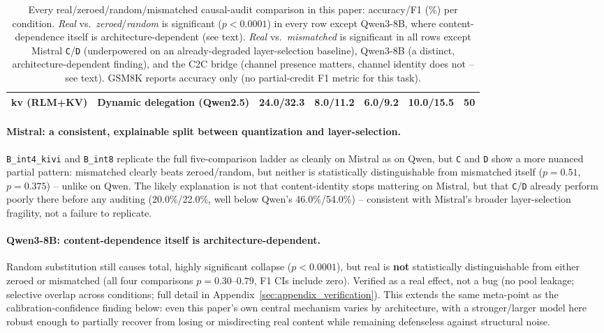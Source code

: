 \documentclass[11pt]{article}
\begin{document}
\begin{table}[t]
\begin{tabular}{llccccc}
kv (RLM+KV)   & Dynamic delegation (Qwen2.5) & 24.0/32.3 & 8.0/11.2 & 6.0/9.2  & 10.0/15.5 & 50 \\
\bottomrule
\end{tabular}
\caption{Every real/zeroed/random/mismatched causal-audit comparison in
this paper: accuracy/F1 (\%) per condition. \emph{Real} vs.\
\emph{zeroed}/\emph{random} is significant ($p<0.0001$) in every row
except Qwen3-8B, where content-dependence itself is architecture-dependent
(see text). \emph{Real} vs.\ \emph{mismatched} is significant in all rows
except Mistral \texttt{C}/\texttt{D} (underpowered on an already-degraded
layer-selection baseline), Qwen3-8B (a distinct, architecture-dependent
finding), and the C2C bridge (channel presence matters, channel identity
does not -- see text). GSM8K reports accuracy only (no partial-credit F1
metric for this task).}
\label{tab:causal_audit_full}
\end{table}

\paragraph{Mistral: a consistent, explainable split between quantization
and layer-selection.} \texttt{B\_int4\_kivi} and \texttt{B\_int8}
replicate the full five-comparison ladder as cleanly on Mistral as on
Qwen, but \texttt{C} and \texttt{D} show a more nuanced partial pattern:
mismatched clearly beats zeroed/random, but neither is statistically
distinguishable from mismatched itself ($p=0.51$, $p=0.375$) -- unlike on
Qwen. The likely explanation is not that content-identity stops mattering
on Mistral, but that \texttt{C}/\texttt{D} already perform poorly there
before any auditing (20.0\%/22.0\%, well below Qwen's 46.0\%/54.0\%) --
consistent with Mistral's broader layer-selection fragility, not a
failure to replicate.

\paragraph{Qwen3-8B: content-dependence itself is architecture-dependent.}
Random substitution still causes total, highly significant collapse
($p<0.0001$), but real is \textbf{not} statistically distinguishable from
either zeroed or mismatched (all four comparisons $p=0.30$--$0.79$, F1
CIs include zero). Verified as a real effect, not a bug (no pool leakage;
selective overlap across conditions; full detail in
Appendix~\ref{sec:appendix_verification}). This extends the same
meta-point as the calibration-confidence finding below: even this
paper's own central mechanism varies by architecture, with a
stronger/larger model here robust enough to partially recover from losing
or misdirecting real content while remaining defenseless against
structural noise.
\end{document}
